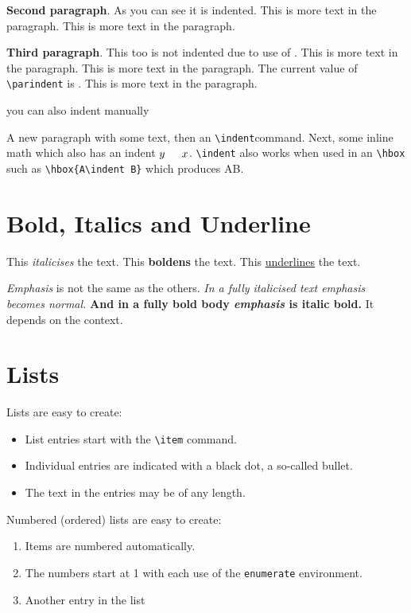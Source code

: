 \documentclass{article}
\begin{document}
\textbf{Second paragraph}. As you can see it is indented. 
This is more text in the paragraph. This is more text in the paragraph. 

\noindent\textbf{Third paragraph}. This too is not indented due to use 
of \texttt{\string\noindent}. This is more text in the paragraph. 
This is more text in the paragraph.  
The current value of \verb|\parindent| is \the\parindent. 
This is more text in the paragraph.

\indent you can also indent \indent manually

\noindent A new paragraph with some text, then an \verb|\indent|\indent command. Next, some inline math which also has an indent $y\indent x$. \verb|\indent| also works when used in an \verb|\hbox| such as \verb|\hbox{A\indent B}| which produces \hbox{A\indent B}.

\section*{Bold, Italics and Underline}

This \textit{italicises} the text.
This \textbf{boldens} the text.
This \underline{underlines} the text.

\par
\emph{Emphasis} is not the same as the others.
\textit{In a fully italicised text \emph{emphasis} becomes normal.}
\textbf{And in a fully bold body \emph{emphasis} is italic bold.} It depends on the context.

\section*{Lists}

Lists are easy to create:
\begin{itemize}
  \item List entries start with the \verb|\item| command.
  \item Individual entries are indicated with a black dot, a so-called bullet.
  \item The text in the entries may be of any length.
\end{itemize}

Numbered (ordered) lists are easy to create:
\begin{enumerate}
  \item Items are numbered automatically.
  \item The numbers start at 1 with each use of the \texttt{enumerate} environment.
  \item Another entry in the list
\end{enumerate}
\end{document}

